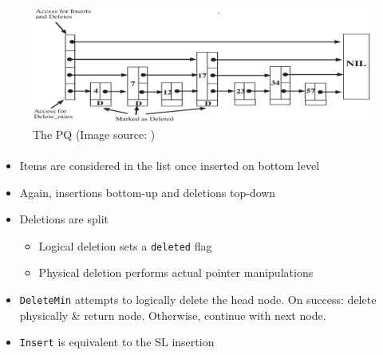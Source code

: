\documentclass[usenames,dvipsnames]{beamer}
\begin{document}
\begin{frame}{}
\framesubtitle{\citeauthor{shavit2000skiplist}}

\begin{figure}
\includegraphics[width=\textwidth]{shavit_lotan}
\caption{The \citeauthor{shavit2000skiplist} \ac{PQ} (Image source: \cite{shavit2000skiplist})}
\end{figure}
\end{frame}

\begin{frame}{}
\framesubtitle{\citeauthor{shavit2000skiplist}}

\begin{itemize}
\item Items are considered in the list once inserted on bottom level
\item Again, insertions bottom-up and deletions top-down
\item Deletions are split
    \begin{itemize}
    \item Logical deletion sets a \lstinline|deleted| flag
    \item Physical deletion performs actual pointer manipulations
    \end{itemize}
\item \lstinline|DeleteMin| attempts to logically delete the head node.
     On success: delete physically \& return node. Otherwise, continue with
     next node.
\item \lstinline|Insert| is equivalent to the \ac{SL} insertion
\end{itemize}
\end{frame}
\end{document}
